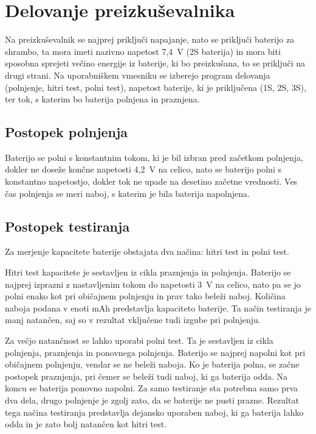 \documentclass[a4paper,twoside,openright,12pt,slovene]{book}
\begin{document}
\chapter{Delovanje preizkuševalnika} \label{ch:delovanje_preizkusevalnika}
Na preizkuševalnik se najprej priključi napajanje, nato se priključi baterijo za shrambo,
ta mora imeti nazivno napetost 7,4~V (2S baterija) in mora biti sposobna sprejeti večino energije iz baterije, ki bo preizkušana, to se priključi na drugi strani.
Na uporabniškem vmesniku se izberejo program delovanja (polnjenje, hitri test, polni test),
napetost baterije, ki je priključena (1S, 2S, 3S), ter tok, s katerim bo baterija polnjena in praznjena.

\section{Postopek polnjenja}\label{sec:postopek-polnjenja}
Baterijo se polni s konstantnim tokom, ki je bil izbran pred začetkom polnjenja, dokler ne doseže končne napetosti 4,2~V na celico,
nato se baterijo polni s konstantno napetostjo, dokler tok ne upade na desetino začetne vrednosti.
Ves čas polnjenja se meri naboj, s katerim je bila baterija napolnjena.

\section{Postopek testiranja}\label{sec:postopek-testiranja}
Za merjenje kapacitete baterije obstajata dva načina: hitri test in polni test.

Hitri test kapacitete je sestavljen iz cikla praznjenja in polnjenja.
Baterijo se najprej izprazni z nastavljenim tokom do napetosti 3~V na celico,
nato pa se jo polni enako kot pri običajnem polnjenju in prav tako beleži naboj.
Količina naboja podana v enoti mAh predstavlja kapaciteto baterije.
Ta način testiranja je manj natančen, saj so v rezultat vključene tudi izgube pri polnjenju.

Za večjo natančnost se lahko uporabi polni test.
Ta je sestavljen iz cikla polnjenja, praznjenja in ponovnega polnjenja.
Baterijo se najprej napolni kot pri običajnem polnjenju, vendar se ne beleži naboja.
Ko je baterija polna, se začne postopek praznjenja, pri čemer se beleži tudi naboj, ki ga baterija odda.
Na koncu se baterija ponovno napolni.
Za samo testiranje sta potrebna samo prva dva dela, drugo polnjenje je zgolj zato, da se baterije ne pusti prazne.
Rezultat tega načina testiranja predstavlja dejansko uporaben naboj, ki ga baterija lahko odda in je zato bolj natančen kot hitri test.
\end{document}
